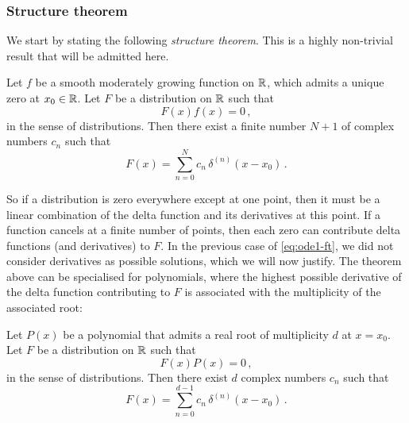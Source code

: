 \subsubsection{Structure theorem}
We start by stating the following \emph{structure theorem}. This is a highly non-trivial
result that will be admitted here.
\begin{theorem}
  \label{thm:structure}
  Let $f$ be a smooth moderately growing function on $\mathbb{R}$, which admits a unique zero at
  $x_0\in\mathbb{R}$. Let $F$ be a distribution on $\mathbb{R}$ such that
  \begin{equation}
    F(x)f(x)=0\,,
  \end{equation}
  in the sense of distributions. Then there exist a finite number $N+1$ of complex numbers
  $c_n$ such that
  \begin{equation}
    F(x)=\sum_{n=0}^{N}c_n\,\delta^{(n)}(x-x_0)\,.
  \end{equation}
\end{theorem}
So if a distribution is zero everywhere except at one point, then it must be a linear
combination of the delta function and its derivatives at this point. If a function cancels
at a finite number of points, then each zero can contribute delta functions (and
derivatives) to $F$. In the previous case of \cref{eq:ode1-ft}, we did not consider
derivatives as possible solutions, which we will now justify. The theorem above can be
specialised for polynomials, where the highest possible derivative of the delta function
contributing to $F$ is associated with the multiplicity of the associated root:
\begin{theorem}
  \label{thm:structure-poly}
  Let $P(x)$ be a polynomial that admits a real root of multiplicity $d$ at $x=x_0$. Let
  $F$ be a distribution on $\mathbb{R}$ such that
  \begin{equation}
    F(x)P(x)=0\,,
    \label{eq:prodzero-poly}
  \end{equation}
  in the sense of distributions. Then there exist $d$ complex numbers $c_n$ such that
  \begin{equation}
    F(x)=\sum_{n=0}^{d-1}c_n\,\delta^{(n)}(x-x_0)\,.
  \end{equation}
\end{theorem}
